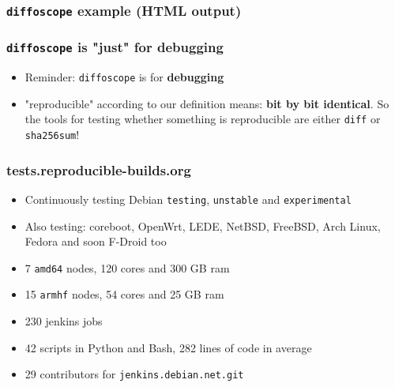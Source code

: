\documentclass[14pt,aspectratio=169]{beamer}
\newif\ifplacelogo
\begin{document}
{\begin{frame}
 \frametitle{\texttt{diffoscope} example (HTML output)}
\end{frame}


\begin{frame}
 \frametitle{\texttt{diffoscope} is "just" for debugging}

 \begin{itemize}
  \item Reminder: \texttt{diffoscope} is for \textbf{debugging}
  \item "reproducible" according to our definition means: \textbf{bit by bit
  identical}. So the tools for testing whether something is reproducible are
  either \texttt{diff} or \texttt{sha256sum}!
 \end{itemize}
\end{frame}

}

\placelogotrue


\begin{frame}
 \frametitle{tests.reproducible-builds.org}

 \begin{itemize}
  \item Continuously testing Debian \texttt{testing}, \texttt{unstable} and
  \texttt{experimental}
  \item Also testing: coreboot, OpenWrt, LEDE, NetBSD, FreeBSD,
  Arch Linux, Fedora and soon F-Droid too
  \item 7 \texttt{amd64} nodes, 120 cores and 300 GB ram
  \item 15 \texttt{armhf} nodes, 54 cores and 25 GB ram
  \item 230 jenkins jobs
  \item 42 scripts in Python and Bash, 282 lines of code in average
  \item 29 contributors for \texttt{jenkins.debian.net.git}
 \end{itemize}
\end{frame}
\end{document}
